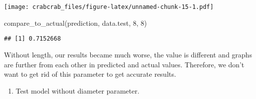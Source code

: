 \documentclass[
]{article}
\newenvironment{Shaded}{\begin{snugshade}}{\end{snugshade}}
\newcommand{\AttributeTok}[1]{\textcolor[rgb]{0.77,0.63,0.00}{#1}}
\newcommand{\DecValTok}[1]{\textcolor[rgb]{0.00,0.00,0.81}{#1}}
\newcommand{\FunctionTok}[1]{\textcolor[rgb]{0.00,0.00,0.00}{#1}}
\newcommand{\NormalTok}[1]{#1}
\newcommand{\OtherTok}[1]{\textcolor[rgb]{0.56,0.35,0.01}{#1}}
\newcommand{\SpecialCharTok}[1]{\textcolor[rgb]{0.00,0.00,0.00}{#1}}
\newcommand{\StringTok}[1]{\textcolor[rgb]{0.31,0.60,0.02}{#1}}
\providecommand{\tightlist}{%
  \setlength{\itemsep}{0pt}\setlength{\parskip}{0pt}}
\begin{document}
\begin{Shaded}
\end{Shaded}

\texttt{[image: crabcrab\_files/figure-latex/unnamed-chunk-15-1.pdf]}

\begin{Shaded}
\begin{Highlighting}[]
\FunctionTok{compare\_to\_actual}\NormalTok{(prediction, data.test, }\DecValTok{8}\NormalTok{, }\DecValTok{8}\NormalTok{)}
\end{Highlighting}
\end{Shaded}

\begin{verbatim}
## [1] 0.7152668
\end{verbatim}

Without length, our results became much worse, the value is different
and graphs are further from each other in predicted and actual values.
Therefore, we don't want to get rid of this parameter to get accurate
results.

\begin{enumerate}
\def\labelenumi{\arabic{enumi}.}
\setcounter{enumi}{3}
\tightlist
\item
  Test model without diameter parameter.
\end{enumerate}
\end{document}
